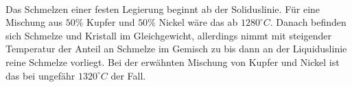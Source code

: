 \documentclass[11pt,a4paper]{article}
\numberwithin{equation}{section}
\numberwithin{figure}{section}
\begin{document}
\\
\begin{addmargin}[25pt]{0pt}
Das Schmelzen einer festen Legierung beginnt ab der Soliduslinie. Für eine Mischung aus $50\%$ Kupfer und $50\%$ Nickel wäre das ab $1280^\circ \si{C}$. Danach befinden sich Schmelze und Kristall im Gleichgewicht, allerdings nimmt mit steigender Temperatur der Anteil an Schmelze im Gemisch zu bis dann an der Liquiduslinie reine Schmelze vorliegt. Bei der erwähnten Mischung von Kupfer und Nickel ist das bei ungefähr $1320^\circ \si{C}$ der Fall. \\
\end{addmargin}
\end{document}
